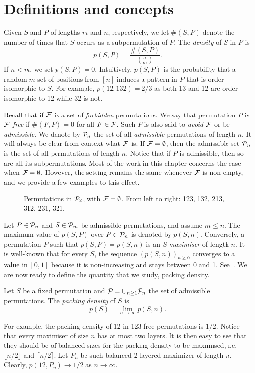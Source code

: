 \documentclass[12pt, a4paper, twoside]{report}
\begin{document}
\section{Definitions and concepts}
\label{sec:defs}

Given $S$ and $P$ of lengths $m$ and $n$, respectively, we let $\#(S, P)$ denote the number of times that $S$ occurs as a subpermutation of $P$. The \emph{density} of $S$ in $P$ is $$p(S,P) = \frac{\#(S,P)}{\binom{n}{m}}.$$ If $n < m$, we set $p(S,P) = 0$. Intuitively, $p(S,P)$ is the probability that a random $m$-set of positions from $[n]$ induces a pattern in $P$ that is order-isomorphic to $S$. For example, $p(12, 132) = 2/3$ as both 13 and 12 are order-isomorphic to 12 while 32 is not.

Recall that if $\F$ is a set of \emph{forbidden} permutations. We say that permutation $P$ is \emph{$\F$-free} if $\#(F,P) = 0$ for all $F \in \F$. Such $P$ is also said to \emph{avoid} $\F$ or be \emph{admissible}. We denote by $\P_n$ the set of all \emph{admissible} permutations of length $n$. It will always be clear from context what $\F$ is. If $\F = \emptyset$, then the admissible set $\P_n$ is the set of all permutations of length $n$. Notice that if $P$ is admissible, then so are all its subpermutations. Most of the work in this chapter concerns the case when $\F = \emptyset$. However, the setting remains the same whenever $\F$ is non-empty, and we provide a few examples to this effect. 

\begin{figure}[ht]
\centering
{}
\caption{\small Permutations in $\P_3$, with $\F = \emptyset$. From left to right: 123, 132, 213, 312, 231, 321.}
\label{fig:exP3}
\end{figure}
Let $P \in \P_n$ and $S \in \P_m$ be admissible permutations, and assume $m \leq n$. The maximum value of $p(S,P)$ over $P \in \P_n$ is denoted by $p(S,n)$. Conversely, a permutation $P$ such that $p(S,P) = p(S,n)$ is an $S$-\emph{maximiser} of length $n$. It is well-known that for every $S$, the sequence $\left(p(S,n)\right)_{n\geq 0}$ converges to a value in $[0,1]$ because it is non-increasing and stays between 0 and 1. See~\cite{katona1964exists}. We are now ready to define the quantity that we study, packing density.

\begin{definition}
Let $S$ be a fixed permutation and $\P = \cup_{n\geq 1}\P_n$ the set of admissible permutations. The \emph{packing density} of $S$ is
$$p(S) = \lim_{n\to\infty}p(S,n).$$
\end{definition}
For example, the packing density of 12 in 123-free permutations is $1/2$. Notice that every maximiser of size $n$ has at most two layers. It is then easy to see that they should be of balanced sizes for the packing density to be maximised, i.e.~$\lfloor n/2 \rfloor$ and $\lceil n/2 \rceil$. Let $P_n$ be such balanced 2-layered maximizer of length $n$. Clearly, $p(12, P_n) \to 1/2$ as $n\to\infty$. 
\end{document}
